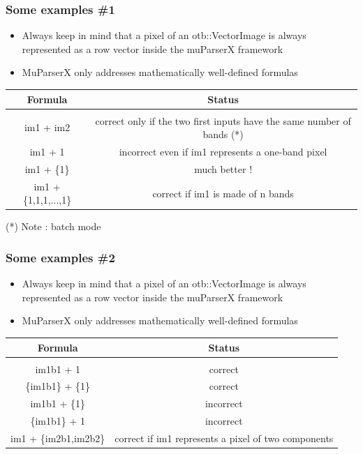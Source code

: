 \documentclass[8pt]{beamer}
\begin{document}
\begin{frame}
\frametitle{Some examples \#1}

\begin{itemize}
\item Always keep in mind that a pixel of an otb::VectorImage is always represented as a row vector inside the muParserX framework
\item MuParserX only addresses mathematically well-defined formulas
\end{itemize}

\begin{center}
\begin{tabular}{c | c}
Formula & Status \\
\hline \\
im1 + im2 & correct only if the two first inputs have the same number of bands (*)\\
im1 + 1  & incorrect even if im1 represents a one-band pixel  \\
im1 + \{1\} & much better ! \\
im1 + \{1,1,1,...,1\} & correct if im1 is made of n bands \\

\end{tabular}
\end{center}

(*) Note : batch mode



\end{frame}

\begin{frame}
\frametitle{Some examples \#2}


\begin{itemize}
\item Always keep in mind that a pixel of an otb::VectorImage is always represented as a row vector inside the muParserX framework
\item MuParserX only addresses mathematically well-defined formulas
\end{itemize}


\begin{center}
\begin{tabular}{c | c}
Formula & Status \\
\hline \\
im1b1 + 1 & correct  \\
\{im1b1\} + \{1\} & correct  \\
im1b1 + \{1\} & incorrect \\
\{im1b1\} + 1 & incorrect \\
im1 + \{im2b1,im2b2\}  &  correct if im1 represents a pixel of two components \\

\end{tabular}
\end{center}


\end{frame}
\end{document}
